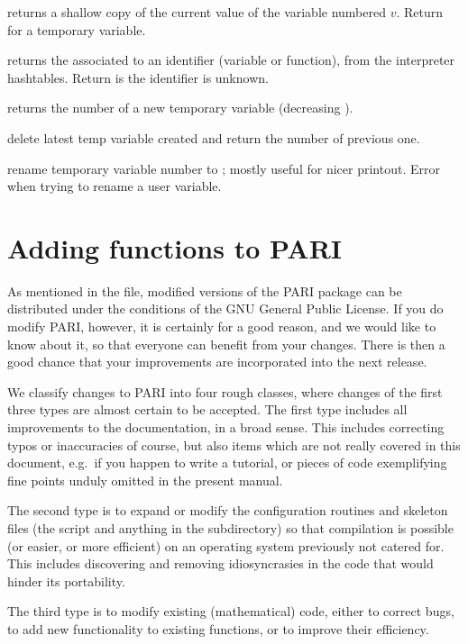  returns a shallow copy of the
current value of the variable numbered $v$. Return  for a temporary
variable.

 returns the  associated
to an identifier  (variable or function), from the interpreter
hashtables. Return  is the identifier is unknown.


 returns the number of a new temporary variable
(decreasing ).

 delete latest temp variable created and return
the number of previous one.

 rename temporary variable number
 to ; mostly useful for nicer printout. Error when trying to
rename a user variable.

\section{Adding functions to PARI}
%
As mentioned in the  file, modified versions of the PARI package
can be distributed under the conditions of the GNU General Public License. If
you do modify PARI, however, it is certainly for a good reason, and we
would like to know about it, so that everyone can benefit from your changes.
There is then a good chance that your improvements are incorporated into the
next release.

We classify changes to PARI into four rough classes, where changes of the
first three types are almost certain to be accepted. The first type includes
all improvements to the documentation, in a broad sense. This includes
correcting typos or inaccuracies of course, but also items which are not
really covered in this document, e.g.~if you happen to write a tutorial,
or pieces of code exemplifying fine points unduly omitted in the present
manual.

The second type is to expand or modify the configuration routines and skeleton
files (the  script and anything in the 
subdirectory) so that compilation is possible (or easier, or more efficient)
on an operating system previously not catered for. This includes discovering
and removing idiosyncrasies in the code that would hinder its portability.

The third type is to modify existing (mathematical) code, either to correct
bugs, to add new functionality to existing functions, or to improve their
efficiency.

